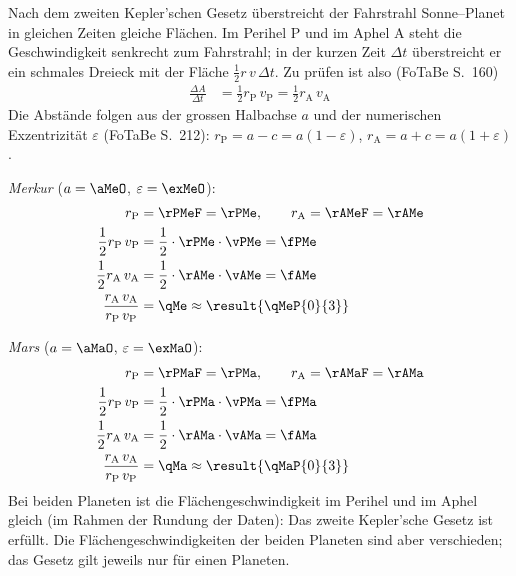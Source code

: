 \begin{center}
\end{center}

Nach dem zweiten Kepler'schen Gesetz überstreicht der Fahrstrahl Sonne--Planet in gleichen Zeiten gleiche Flächen. Im Perihel P und im Aphel A steht die Geschwindigkeit senkrecht zum Fahrstrahl; in der kurzen Zeit $\Delta t$ überstreicht er ein schmales Dreieck mit der Fläche $\frac{1}{2}r\,v\,\Delta t$. Zu prüfen ist also (FoTaBe S.~160)
\begin{align}
 \frac{\Delta A}{\Delta t} &= \frac{1}{2}r_\text{P}\,v_\text{P} = \frac{1}{2}r_\text{A}\,v_\text{A}
\end{align}
Die Abstände folgen aus der grossen Halbachse $a$ und der numerischen Exzentrizität $\varepsilon$ (FoTaBe S.~212): $r_\text{P} = a - c = a\left(1-\varepsilon\right)$, $r_\text{A} = a + c = a\left(1+\varepsilon\right)$.

\emph{Merkur} ($a = \aMeO$, $\varepsilon = \exMeO$):
\begin{align}
 r_\text{P} &= \rPMeF = \rPMe, \qquad r_\text{A} = \rAMeF = \rAMe \\
 \frac{1}{2}r_\text{P}\,v_\text{P} &= \frac{1}{2}\cdot\rPMe\cdot\vPMe = \fPMe \\
 \frac{1}{2}r_\text{A}\,v_\text{A} &= \frac{1}{2}\cdot\rAMe\cdot\vAMe = \fAMe \\
 \frac{r_\text{A}\,v_\text{A}}{r_\text{P}\,v_\text{P}} &= \qMe \approx \result{\qMeP{0}{3}}
\end{align}

\emph{Mars} ($a = \aMaO$, $\varepsilon = \exMaO$):
\begin{align}
 r_\text{P} &= \rPMaF = \rPMa, \qquad r_\text{A} = \rAMaF = \rAMa \\
 \frac{1}{2}r_\text{P}\,v_\text{P} &= \frac{1}{2}\cdot\rPMa\cdot\vPMa = \fPMa \\
 \frac{1}{2}r_\text{A}\,v_\text{A} &= \frac{1}{2}\cdot\rAMa\cdot\vAMa = \fAMa \\
 \frac{r_\text{A}\,v_\text{A}}{r_\text{P}\,v_\text{P}} &= \qMa \approx \result{\qMaP{0}{3}}
\end{align}
Bei beiden Planeten ist die Flächengeschwindigkeit im Perihel und im Aphel gleich (im Rahmen der Rundung der Daten): Das zweite Kepler'sche Gesetz ist erfüllt. Die Flächengeschwindigkeiten der beiden Planeten sind aber verschieden; das Gesetz gilt jeweils nur für einen Planeten.
